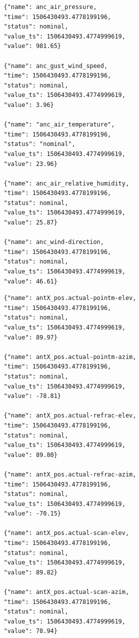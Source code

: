         
\begin{tcolorbox}
\begin{lstlisting}
   {"name": anc_air_pressure,
   "time": 1506430493.4778199196,
   "status": nominal,
   "value_ts": 1506430493.4774999619,
   "value": 981.65}
   
   {"name": anc_gust_wind_speed,
   "time": 1506430493.4778199196,
   "status": nominal,
   "value_ts": 1506430493.4774999619,
   "value": 3.96}

   {"name": "anc_air_temperature",
   "time": 1506430493.4778199196,
   "status": "nominal",
   "value_ts": 1506430493.4774999619,
   "value": 23.96}

   {"name": anc_air_relative_humidity,
   "time": 1506430493.4778199196,
   "status": nominal,
   "value_ts": 1506430493.4774999619,
   "value": 25.87}

   {"name": anc_wind-direction,
   "time": 1506430493.4778199196,
   "status": nominal,
   "value_ts": 1506430493.4774999619,
   "value": 46.61}
\end{lstlisting}
\end{tcolorbox}

\begin{tcolorbox}
\begin{lstlisting}
   {"name": antX_pos.actual-pointm-elev,
   "time": 1506430493.4778199196,
   "status": nominal,
   "value_ts": 1506430493.4774999619,
   "value": 89.97}
   
   {"name": antX_pos.actual-pointm-azim,
   "time": 1506430493.4778199196,
   "status": nominal,
   "value_ts": 1506430493.4774999619,
   "value": -78.81}
   
   {"name": antX_pos.actual-refrac-elev,
   "time": 1506430493.4778199196,
   "status": nominal,
   "value_ts": 1506430493.4774999619,
   "value": 89.80}
   
   {"name": antX_pos.actual-refrac-azim,
   "time": 1506430493.4778199196,
   "status": nominal,
   "value_ts": 1506430493.4774999619,
   "value": -70.15}
   
   {"name": antX_pos.actual-scan-elev,
   "time": 1506430493.4778199196,
   "status": nominal,
   "value_ts": 1506430493.4774999619,
   "value": 89.82}
   
   {"name": antX_pos.actual-scan-azim,
   "time": 1506430493.4778199196,
   "status": nominal,
   "value_ts": 1506430493.4774999619,
   "value": 78.94}
   
\end{lstlisting}
\end{tcolorbox}

